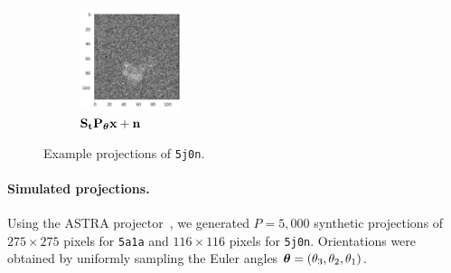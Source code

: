 \begin{figure}[ht!]
\begin{minipage}[b]{0.45\linewidth}
        \hfill
        \begin{subfigure}[b]{0.49\linewidth}
            \centering
            \includegraphics[height=3cm]{figures/5j0n_noise16_translated}
            \caption{$\mathbf{S}_{\mathbf{t}} \mathbf{P}_{{\boldsymbol{\theta}}} \mathbf{x} + \mathbf{n}$}
        \end{subfigure}
        \caption{%
            Example projections of \texttt{5j0n}.
        }\label{fig:different-projections}
    \end{minipage}
\end{figure}

\paragraph{Simulated projections.}
Using the ASTRA projector~\cite{van2015astra}, we generated $P=5,000$ synthetic projections of $275 \times 275$ pixels for \texttt{5a1a} and $116 \times 116$ pixels for \texttt{5j0n}.
Orientations were obtained by uniformly sampling the Euler angles ${\boldsymbol{\theta}} = (\theta_3,\theta_2,\theta_1)$.
\banjac{}

